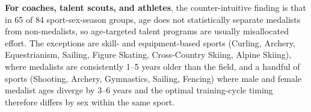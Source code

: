 \documentclass[11pt]{article}
\begin{document}
\textbf{For coaches, talent scouts, and athletes}, the counter-intuitive finding is that in 65 of 84 sport-sex-season groups, age does not statistically separate medalists from non-medalists, so age-targeted talent programs are usually misallocated effort. The exceptions are skill- and equipment-based sports (Curling, Archery, Equestrianism, Sailing, Figure Skating, Cross-Country Skiing, Alpine Skiing), where medalists are consistently 1--5 years older than the field, and a handful of sports (Shooting, Archery, Gymnastics, Sailing, Fencing) where male and female medalist ages diverge by 3--6 years and the optimal training-cycle timing therefore differs by sex within the same sport.
\end{document}
